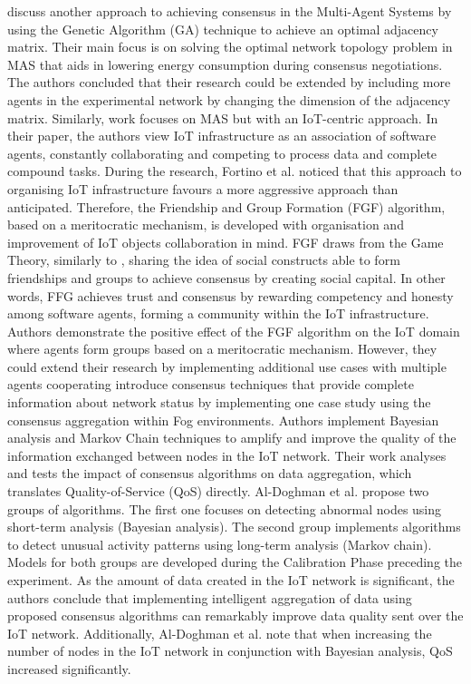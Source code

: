 \documentclass[oneside,12pt]{book}
\begin{document}
\cite{MONDAL202041} discuss another approach to achieving consensus in the Multi-Agent Systems by using the Genetic Algorithm (GA) technique to achieve an optimal adjacency matrix. Their main focus is on solving the optimal network topology problem in MAS that aids in lowering energy consumption during consensus negotiations. The authors concluded that their research could be extended by including more agents in the experimental network by changing the dimension of the adjacency matrix.\smallskip \newline
Similarly, \cite{FORTINO202034} work focuses on MAS but with an IoT-centric approach. In their paper, the authors view IoT infrastructure as an association of software agents, constantly collaborating and competing to process data and complete compound tasks. During the research, Fortino et al. noticed that this approach to organising IoT infrastructure favours a more aggressive approach than anticipated. Therefore, the Friendship and Group Formation (FGF) algorithm, based on a meritocratic mechanism, is developed with organisation and improvement of IoT objects collaboration in mind. FGF draws from the Game Theory, similarly to \cite{GULATI2020102222}, sharing the idea of social constructs able to form friendships and groups to achieve consensus by creating social capital. In other words, FFG achieves trust and consensus by rewarding competency and honesty among software agents, forming a community within the IoT infrastructure. Authors demonstrate the positive effect of the FGF algorithm on the IoT domain where agents form groups based on a meritocratic mechanism. However, they could extend their research by implementing additional use cases with multiple agents cooperating\smallskip \newline
\cite{8638200} introduce consensus techniques that provide complete information about network status by implementing one case study using the consensus aggregation within Fog environments. Authors implement Bayesian analysis and Markov Chain techniques to amplify and improve the quality of the information exchanged between nodes in the IoT network. Their work analyses and tests the impact of consensus algorithms on data aggregation, which translates Quality-of-Service (QoS) directly. Al-Doghman et al. propose two groups of algorithms. The first one focuses on detecting abnormal nodes using short-term analysis (Bayesian analysis). The second group implements algorithms to detect unusual activity patterns using long-term analysis (Markov chain). Models for both groups are developed during the Calibration Phase preceding the experiment. As the amount of data created in the IoT network is significant, the authors conclude that implementing intelligent aggregation of data using proposed consensus algorithms can remarkably improve data quality sent over the IoT network. Additionally, Al-Doghman et al. note that when increasing the number of nodes in the IoT network in conjunction with Bayesian analysis, QoS increased significantly.\smallskip \newline
\end{document}
